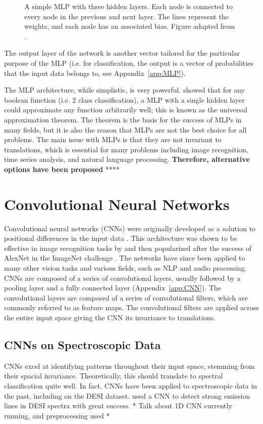 \begin{figure}[t]
    \centering
    
    \caption{A simple MLP with three hidden layers. Each node is connected to every 
    node in the previous and next layer. The lines represent the weights, and each 
    node has an associated bias. Figure adapted from \textcite{neutelings2023}.}
    \label{fig:MLP}
\end{figure}


The output layer of the network is another vector tailored for the particular purpose
of the MLP (i.e. for classification, the output is a vector of probabilities 
that the input data belongs to, see Appendix~\ref{app:MLP}). 

The MLP architecture, while simplistic, is very powerful. \textcite{cybenko1989} showed that for any boolean 
function (i.e. 2 class classification), a MLP with a single hidden layer could 
approximate any function arbitrarily well; this is known as the universal approximation
theorem. The theorem is the basis for the success of MLPs in
many fields, but it is also the reason that MLPs are not the best choice for all problems.
The main issue with MLPs is that they are not invariant to translations, which is 
essential for many problems including image recognition, time series analysis, and 
natural language processing. \textbf{Therefore, alternative options have been proposed }**** 

\section{Convolutional Neural Networks}\label{sec:CNN}
Convolutional neural networks (CNNs) were originally developed as a solution 
to positional differences in the input data \parencite{fukushima1979}. This architecture 
was shown to be effective in image recognition tasks by \textcite{lecun2004} and then popularized after the success of AlexNet in the 
ImageNet challenge \textcite{krizhevsky2012}. The networks have since been applied to
many other vision tasks and various fields, such as NLP and audio processing. 
CNNs are composed of a series of convolutional layers, usually followed by a 
pooling layer and a fully connected layer (Appendix~\ref{app:CNN}). The convolutional layers are composed of a series of convolutional filters, which are commonly referred to as feature maps.
The convolutional filters are applied across the entire input space giving the CNN its invariance to translations.

\subsection{CNNs on Spectroscopic Data}
\label{sec:CNNspectra}
CNNs excel at identifying patterns throughout their input space, stemming from their spacial invariance. Theoretically, this should translate to spectral classification quite well. In fact, CNNs have been applied 
to spectroscopic data in the past, including on the DESI dataset. 
\textcite{parks2018} used a CNN to detect strong emission lines in DESI spectra with 
great success. * Talk about 1D CNN currently running, and preprocessing used *

